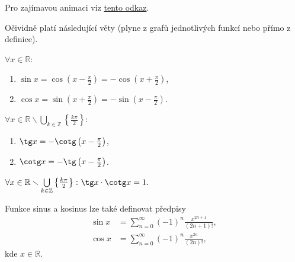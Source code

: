 \begin{pozn}
    Pro zajímavou animaci viz \href{https://upload.wikimedia.org/wikipedia/commons/3/3b/Circle_cos_sin.gif}{tento odkaz}.
\end{pozn}

\begin{pozn}
    Očividně platí následující věty (plyne z grafů jednotlivých funkcí nebo přímo z definice).
\end{pozn}

\begin{veta}
  $\forall x \in \mathbb{R}\colon$
  \begin{enumerate}[$i.$]
    \item $\sin x = \cos \left(x- \frac{\pi}{2}\right)=-\cos\left(x+\frac{\pi}{2}\right)$,
 	\item $\cos x = \sin \left(x+\frac{\pi}{2}\right)=-\sin \left(x- \frac{\pi}{2} \right)$.
  \end{enumerate}
\end{veta}

\begin{veta}
  $\forall x \in \mathbb{R}\smallsetminus\bigcup\limits_{k\in \mathbb Z} \left \{ \frac{k\pi}{2} \right \} \colon$
  \begin{enumerate}[$i.$]
    \item $\tg x = -\cotg \left ( x- \frac{\pi}{2} \right )$,
 	\item $\cotg x = -\tg \left ( x- \frac{\pi}{2} \right )$.
  \end{enumerate}
\end{veta}

\begin{veta}
  $\forall x \in \mathbb{R}\smallsetminus\bigcup\limits_{k\in \mathbb Z} \left \{ \frac{k\pi}{2} \right \}\colon \tg x \cdot \cotg x = 1.$
\end{veta}

\begin{pozn}
    Funkce sinus a kosinus lze také definovat předpisy
    \begin{align*}
        \sin x & = \sum_{n=0}^\infty (-1)^n \frac{x^{2n+1}}{(2n+1)!},\\
        \cos x & = \sum_{n=0}^\infty (-1)^n \frac{x^{2n}}{(2n)!},
    \end{align*}
    kde $x \in \mathbb R.$
\end{pozn}
